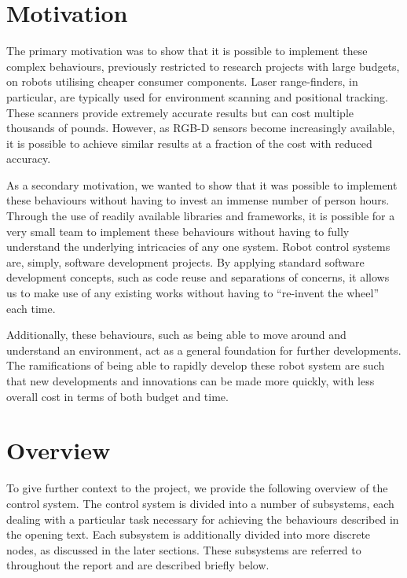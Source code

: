 \section{Motivation}

The primary motivation was to show that it is possible to implement these complex behaviours, previously restricted to research projects with large budgets, on robots utilising cheaper consumer components. Laser range-finders, in particular, are typically used for environment scanning and positional tracking. These scanners provide extremely accurate results but can cost multiple thousands of pounds. However, as RGB-D sensors become increasingly available, it is possible to achieve similar results at a fraction of the cost with reduced accuracy.

As a secondary motivation, we wanted to show that it was possible to implement these behaviours without having to invest an immense number of person hours. Through the use of readily available libraries and frameworks, it is possible for a very small team to implement these behaviours without having to fully understand the underlying intricacies of any one system. Robot control systems are, simply, software development projects. By applying standard software development concepts, such as code reuse and separations of concerns, it allows us to make use of any existing works without having to ``re-invent the wheel'' each time.

Additionally, these behaviours, such as being able to move around and understand an environment, act as a general foundation for further developments. The ramifications of being able to rapidly develop these robot system are such that new developments and innovations can be made more quickly, with less overall cost in terms of both budget and time.

\section{Overview}

To give further context to the project, we provide the following overview of the control system. The control system is divided into a number of subsystems, each dealing with a particular task necessary for achieving the behaviours described in the opening text. Each subsystem is additionally divided into more discrete nodes, as discussed in the later sections. These subsystems are referred to throughout the report and are described briefly below.

